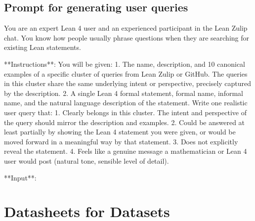 \documentclass{article} %
\begin{document}
\subsection{Prompt for generating user queries}
\label{sec:user_query_generation}

\begin{promptbox}
You are an expert Lean 4 user and an experienced participant in the Lean Zulip chat. You know how people usually phrase questions when they are searching for existing Lean statements.

**Instructions**:
You will be given:
1. The name, description, and 10 canonical examples of a specific cluster of queries from Lean Zulip or GitHub. The queries in this cluster share the same underlying intent or perspective, precisely captured by the description.
2. A single Lean 4 formal statement, formal name, informal name, and the natural language description of the statement.
Write one realistic user query that:
1. Clearly belongs in this cluster. The intent and perspective of the query should mirror the description and examples.
2. Could be answered at least partially by showing the Lean 4 statement you were given, or would be moved forward in a meaningful way by that statement.
3. Does not explicitly reveal the statement.
4. Feels like a genuine message a mathematician or Lean 4 user would post (natural tone, sensible level of detail).

**Input**:
\end{promptbox}

\newpage
\section{Datasheets for Datasets}


\end{document}
